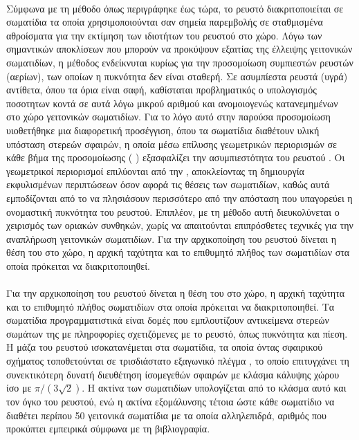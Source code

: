 \paragraph{} Σύμφωνα με τη μέθοδο  όπως περιγράφηκε έως τώρα, το ρευστό
διακριτοποιείται σε σωματίδια τα οποία χρησιμοποιούνται σαν σημεία παρεμβολής σε
σταθμισμένα αθροίσματα για την εκτίμηση των ιδιοτήτων του ρευστού στο χώρο. Λόγω των
σημαντικών αποκλίσεων που μπορούν να προκύψουν εξαιτίας της έλλειψης γειτονικών
σωματιδίων, η μέθοδος ενδείκνυται κυρίως για την προσομοίωση συμπιεστών ρευστών (αερίων),
των οποίων η πυκνότητα δεν είναι σταθερή. Σε ασυμπίεστα ρευστά (υγρά) αντίθετα, όπου τα
όρια είναι σαφή, καθίσταται προβληματικός ο υπολογισμός ποσοτητων κοντά σε αυτά λόγω
μικρού αριθμού και ανομοιογενώς κατανεμημένων στο χώρο γειτονικών σωματιδίων. Για το λόγο
αυτό στην παρούσα προσομοίωση υιοθετήθηκε μια διαφορετική προσέγγιση, όπου τα σωματίδια
διαθέτουν υλική υπόσταση στερεών σφαιρών, η οποία μέσω επίλυσης γεωμετρικών περιορισμών σε
κάθε βήμα της προσομοίωσης ( \cite{Muller2007109})
εξασφαλίζει την ασυμπιεστότητα του ρευστού \cite{macklin2013position}. Οι γεωμετρικοί
περιορισμοί επιλύονται από την , αποκλείοντας τη δημιουργία εκφυλισμένων
περιπτώσεων όσον αφορά τις θέσεις των σωματιδίων, καθώς αυτά εμποδίζονται από το να
πλησιάσουν περισσότερο από την απόσταση που υπαγορεύει η ονομαστική πυκνότητα του
ρευστού. Επιπλέον, με τη μέθοδο αυτή διευκολύνεται ο χειρισμός των οριακών συνθηκών, χωρίς
να απαιτούνται επιπρόσθετες τεχνικές για την αναπλήρωση γειτονικών σωματιδίων. Για την
αρχικοποίηση του ρευστού δίνεται η θέση του στο χώρο, η αρχική ταχύτητα και το επιθυμητό
πλήθος των σωματιδίων στα οποία πρόκειται να διακριτοποιηθεί.

\paragraph{} Για την αρχικοποίηση του ρευστού δίνεται η θέση του στο χώρο, η αρχική
ταχύτητα και το επιθυμητό πλήθος σωματιδίων στα οποία πρόκειται να διακριτοποιηθεί. Τα
σωματίδια προγραμματιστικά είναι δομές  που εμπλουτίζουν αντικείμενα στερεών
σωμάτων  της  με πληροφορίες σχετιζόμενες με το ρευστό, όπως
πυκνότητα και πίεση. Η μάζα του ρευστού ισοκατανέμεται στα σωματίδια, τα οποία όντας
σφαιρικού σχήματος τοποθετούνται σε τρισδιάστατο εξαγωνικό πλέγμα , το οποίο επιτυγχάνει τη συνεκτικότερη δυνατή διευθέτηση ίσομεγεθών
σφαιρών με κλάσμα κάλυψης χώρου ίσο με $\pi/(3\sqrt{2})$.
Η ακτίνα των σωματιδίων υπολογίζεται από το κλάσμα αυτό και τον όγκο του ρευστού, ενώ η
ακτίνα εξομάλυνσης  τέτοια ώστε κάθε σωματίδιο να διαθέτει περίπου 50 γειτονικά
σωματίδια με τα οποία αλληλεπιδρά, αριθμός που προκύπτει εμπειρικά σύμφωνα με τη
βιβλιογραφία.


